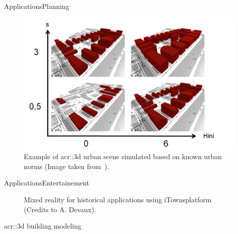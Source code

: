 \documentclass[10pt]{beamer}
\begin{document}
            \begin{frame}{Applications}{Planning}
                \begin{figure}[H]
                    \centering
                    \includegraphics[width=.8\textwidth]{images/introduction/3d_model_applications/simplu}
                    \caption{Example of \gls{acr::3d} urban scene simulated based on known urban norms (Image taken from~\parencite{brasebin2017stochastic}).}
                \end{figure}
            \end{frame}

            \begin{frame}{Applications}{Entertainement}
                \begin{figure}[H]
                    \centering
                    \caption{Mixed reality for historical applications using iTowns\footnotemark platform (Credits to A. Devaux\footnotemark).}
                \end{figure}
                \addtocounter{footnote}{1}
            \end{frame}

            \begin{frame}{\texorpdfstring{\acrshort*{acr::3d}}{3D} building modeling}
                \centering
                
            \end{frame}
\end{document}
